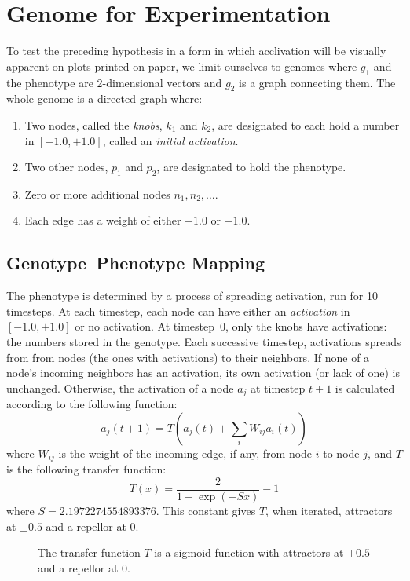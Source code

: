 \documentclass[letterpaper]{article}
\begin{document}
\section{Genome for Experimentation}

To test the preceding hypothesis in a form in which acclivation will be
visually apparent on plots printed on paper, we limit ourselves to genomes
where $g_1$ and the phenotype are 2-dimensional vectors and $g_2$ is a graph
connecting them.  The whole genome is a directed graph where:
\begin{enumerate}
   \item Two nodes, called the \textit{knobs}, $k_1$ and $k_2$, are designated
      to each hold a number in $[-1.0, +1.0]$, called an \textit{initial
      activation}.
   \item Two other nodes, $p_1$ and $p_2$, are designated to hold the
      phenotype.
   \item Zero or more additional nodes $n_1, n_2, \ldots$.
   \item Each edge has a weight of either $+1.0$ or $-1.0$.
\end{enumerate}

\subsection{Genotype--Phenotype Mapping}

The phenotype is determined by a process of spreading activation, run for
10 timesteps. At each timestep, each node can have either an
\textit{activation} in $[-1.0,+1.0]$ or no activation. At timestep~0, only the
knobs have activations: the numbers stored in the genotype. Each successive
timestep, activations spreads from from nodes (the ones with activations) to
their neighbors. If none of a node's incoming neighbors has an activation, its
own activation (or lack of one) is unchanged. Otherwise, the activation of a
node $a_j$ at timestep $t+1$ is calculated according to the following
function:
\[
   a_j(t+1) = T(a_j(t) + \sum_iW_{ij}a_i(t))
\]
where $W_{ij}$ is the weight of the incoming edge, if any, from node $i$ to
node $j$, and $T$ is the following transfer function:
\[
   T(x) = \frac{2}{1+\exp(-Sx)}-1
\]
where $S=2.1972274554893376$. This constant gives $T$, when iterated,
attractors at $\pm0.5$ and a repellor at 0.

\begin{figure}
\centering
{}
\caption{The transfer function $T$ is a sigmoid function with attractors at
$\pm0.5$ and a repellor at $0$.}
\end{figure}
\end{document}

